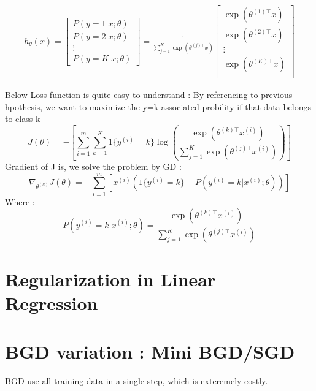 \documentclass{article}
\begin{document}
\begin{align}
h_\theta(x) =
\begin{bmatrix}
P(y = 1 | x; \theta) \\
P(y = 2 | x; \theta) \\
\vdots \\
P(y = K | x; \theta)
\end{bmatrix}
=
\frac{1}{ \sum_{j=1}^{K}{\exp(\theta^{(j)\top} x) }}
\begin{bmatrix}
\exp(\theta^{(1)\top} x ) \\
\exp(\theta^{(2)\top} x ) \\
\vdots \\
\exp(\theta^{(K)\top} x ) \\
\end{bmatrix}
\end{align}

Below Loss function  is quite easy to understand : By referencing to previous hpothesis, we want to maximize the y=k associated probility if that data belongs to class k
\[J(\theta) = -\left[ \sum_{i=1}^m \sum_{k=1}^K 1\{y^{(i)}=k\} \log \left( \frac{\exp(\theta^{(k)\top} x^{(i)})}{\sum_{j=1}^K \exp(\theta^{(j)\top} x^{(i)})} \right) \right]\]
Gradient of J is, we solve the problem by  GD : 
\[\nabla_{\theta^{(k)}} J(\theta) = -\sum_{i=1}^m \left[ x^{(i)} \left( 1\{y^{(i)}=k\} - P(y^{(i)}=k|x^{(i)};\theta) \right) \right]\]
Where : 
\[P(y^{(i)}=k|x^{(i)};\theta) = \frac{\exp(\theta^{(k)\top} x^{(i)})}{\sum_{j=1}^K \exp(\theta^{(j)\top} x^{(i)})}\]
\section{Regularization in Linear Regression}

\section{BGD variation : Mini BGD/SGD}
BGD use all training data in a single step, which is exteremely costly.
\end{document}
